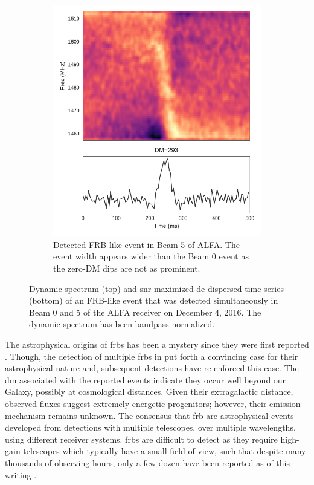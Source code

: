 \documentclass[a4paper,fleqn,usenatbib]{mnras}
\begin{document}
\begin{figure}
\begin{subfigure}[t]{0.45\textwidth}
        \includegraphics[width=1.0\textwidth]{figures/D20161204_buf4_Beam5.pdf}
        \caption{Detected FRB-like event in Beam 5 of ALFA. The event width
        appears wider than the Beam 0 event as the zero-DM dips are not as
        prominent.
        }
        \label{fig:beam5_dynamic_spec}
    \end{subfigure}
    \caption{
    Dynamic spectrum (top) and \gls{snr}-maximized de-dispersed time series
    (bottom) of an FRB-like event that was detected simultaneously in Beam 0 and
    5 of the ALFA receiver on December 4, 2016. The dynamic spectrum has been
    bandpass normalized.
    }
    \label{fig:dynamic_spec}
\end{figure}

The astrophysical origins of \glspl{frb} has been a mystery since they were
first reported \citep{2007Sci...318..777L}.  Though, the detection of multiple
\glspl{frb} in \cite{2013Sci...341...53T} put forth a convincing case for their
astrophysical nature and, subsequent detections have re-enforced this case.  The
\gls{dm} associated with the reported events indicate they occur well beyond our
Galaxy, possibly at cosmological distances.  Given their extragalactic distance,
observed fluxes suggest extremely energetic progenitors; however, their emission
mechanism remains unknown.  The consensus that \gls{frb} are astrophysical
events developed from  detections with multiple telescopes, over multiple
wavelengths, using different receiver systems.  \glspl{frb} are difficult to
detect as they require high-gain telescopes which typically have a small field
of view, such that despite many thousands of observing hours, only a few dozen
have been reported as of this writing \citep{2016PASA...33...45P}.
\end{document}
